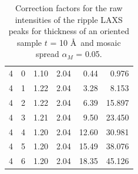 \begin{table}[htbp]
\begin{tabular}{rrrrrr}
    4  & 0  & 1.10 & 2.04 & 0.44  & 0.976   \\
    4  & 1  & 1.22 & 2.04 & 3.28  & 8.153   \\
    4  & 2  & 1.22 & 2.04 & 6.39  & 15.897  \\
    4  & 3  & 1.21 & 2.04 & 9.50  & 23.450  \\
    4  & 4  & 1.20 & 2.04 & 12.60 & 30.981  \\
    4  & 5  & 1.20 & 2.04 & 15.49 & 38.076  \\
    4  & 6  & 1.20 & 2.04 & 18.35 & 45.126  \\
    \hline
    \end{tabular}%
  \caption{Correction factors for the raw intensities of the ripple LAXS 
  peaks for thickness of an oriented sample $t$ = 10 \AA\ and mosaic
  spread $\alpha_M$ = 0.05\textdegree.}
  \label{tab:LAXS_correction1}%
\end{table}%
    
